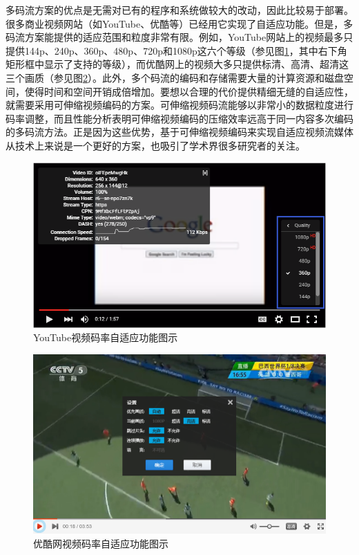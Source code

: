 多码流方案的优点是无需对已有的程序和系统做较大的改动，因此比较易于部署\supercite{Bouten2014}。很多商业视频网站（如YouTube、优酷等）已经用它实现了自适应功能。但是，多码流方案能提供的适应范围和粒度非常有限。例如，YouTube网站上的视频最多只提供144p、240p、360p、480p、720p和1080p这六个等级（参见图\ref{fig:13-1}，其中右下角矩形框中显示了支持的等级），而优酷网上的视频大多只提供标清、高清、超清这三个画质（参见图\ref{fig:13}）。此外，多个码流的编码和存储需要大量的计算资源和磁盘空间，使得时间和空间开销成倍增加。要想以合理的代价提供精细无缝的自适应性，就需要采用可伸缩视频编码的方案。可伸缩视频码流能够以非常小的数据粒度进行码率调整，而且性能分析表明可伸缩视频编码的压缩效率远高于同一内容多次编码的多码流方法\supercite{SVC-Performance}。正是因为这些优势，基于可伸缩视频编码来实现自适应视频流媒体从技术上来说是一个更好的方案，也吸引了学术界很多研究者的关注\supercite{Chuah2012, Zhu2013, Dan2013, Yang2014, Cicalo2014}。

\begin{figure}[t]
	\centering
	\vspace{20pt}
	\includegraphics[width = 1.0\linewidth]{clip/13-1.png}
	\vspace{10pt}
	\caption{YouTube视频码率自适应功能图示\label{fig:13-1}}
	\vspace{10pt}
\end{figure}

\begin{figure}[t]
	\centering
	\vspace{20pt}
	\includegraphics[width = 1.0\linewidth]{clip/13.png}
	\vspace{10pt}
	\caption{优酷网视频码率自适应功能图示\label{fig:13}}
	\vspace{10pt}
\end{figure}

